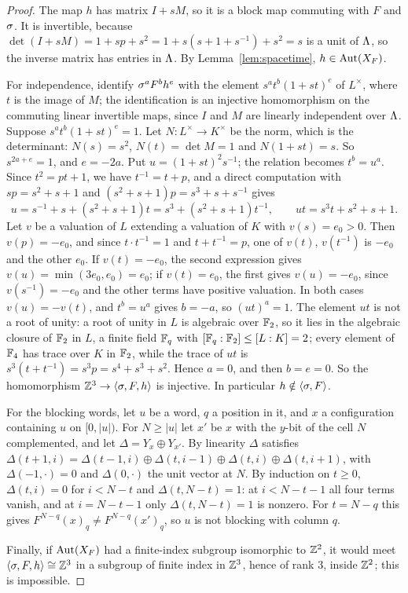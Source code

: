 \begin{proof}
The map $h$ has matrix $I+sM$, so it is a block map commuting with $F$ and $\sigma$. It is invertible, because $\det(I+sM)=1+sp+s^2=1+s(s+1+s^{-1})+s^2=s$ is a unit of $\Lambda$, so the inverse matrix has entries in $\Lambda$. By Lemma~\ref{lem:spacetime}, $h\in\operatorname{Aut}(X_F)$.

For independence, identify $\sigma^aF^bh^e$ with the element $s^at^b(1+st)^e$ of $L^\times$, where $t$ is the image of $M$; the identification is an injective homomorphism on the commuting linear invertible maps, since $I$ and $M$ are linearly independent over $\Lambda$. Suppose $s^at^b(1+st)^e=1$. Let $N\colon L^\times\to K^\times$ be the norm, which is the determinant: $N(s)=s^2$, $N(t)=\det M=1$ and $N(1+st)=s$. So $s^{2a+e}=1$, and $e=-2a$. Put $u=(1+st)^2s^{-1}$; the relation becomes $t^b=u^a$. Since $t^2=pt+1$, we have $t^{-1}=t+p$, and a direct computation with $sp=s^2+s+1$ and $(s^2+s+1)p=s^3+s+s^{-1}$ gives
\[
u=s^{-1}+s+(s^2+s+1)t=s^3+(s^2+s+1)t^{-1},\qquad ut=s^3t+s^2+s+1 .
\]
Let $v$ be a valuation of $L$ extending a valuation of $K$ with $v(s)=e_0>0$. Then $v(p)=-e_0$, and since $t\cdot t^{-1}=1$ and $t+t^{-1}=p$, one of $v(t)$, $v(t^{-1})$ is $-e_0$ and the other $e_0$. If $v(t)=-e_0$, the second expression gives $v(u)=\min(3e_0,e_0)=e_0$; if $v(t)=e_0$, the first gives $v(u)=-e_0$, since $v(s^{-1})=-e_0$ and the other terms have positive valuation. In both cases $v(u)=-v(t)$, and $t^b=u^a$ gives $b=-a$, so $(ut)^a=1$. The element $ut$ is not a root of unity: a root of unity in $L$ is algebraic over $\mathbb{F}_2$, so it lies in the algebraic closure of $\mathbb{F}_2$ in $L$, a finite field $\mathbb{F}_q$ with $[\mathbb{F}_q:\mathbb{F}_2]\le[L:K]=2$; every element of $\mathbb{F}_4$ has trace over $K$ in $\mathbb{F}_2$, while the trace of $ut$ is $s^3(t+t^{-1})=s^3p=s^4+s^3+s^2$. Hence $a=0$, and then $b=e=0$. So the homomorphism $\mathbb{Z}^3\to\langle\sigma,F,h\rangle$ is injective. In particular $h\notin\langle\sigma,F\rangle$.

For the blocking words, let $u$ be a word, $q$ a position in it, and $x$ a configuration containing $u$ on $[0,|u|)$. For $N\ge|u|$ let $x'$ be $x$ with the $y$-bit of the cell $N$ complemented, and let $\Delta=Y_x\oplus Y_{x'}$. By linearity $\Delta$ satisfies $\Delta(t+1,i)=\Delta(t-1,i)\oplus\Delta(t,i-1)\oplus\Delta(t,i)\oplus\Delta(t,i+1)$, with $\Delta(-1,\cdot)=0$ and $\Delta(0,\cdot)$ the unit vector at $N$. By induction on $t\ge0$, $\Delta(t,i)=0$ for $i<N-t$ and $\Delta(t,N-t)=1$: at $i<N-t-1$ all four terms vanish, and at $i=N-t-1$ only $\Delta(t,N-t)=1$ is nonzero. For $t=N-q$ this gives $F^{N-q}(x)_q\ne F^{N-q}(x')_q$, so $u$ is not blocking with column $q$.

Finally, if $\operatorname{Aut}(X_F)$ had a finite-index subgroup isomorphic to $\mathbb{Z}^2$, it would meet $\langle\sigma,F,h\rangle\cong\mathbb{Z}^3$ in a subgroup of finite index in $\mathbb{Z}^3$, hence of rank $3$, inside $\mathbb{Z}^2$; this is impossible.
\end{proof}

